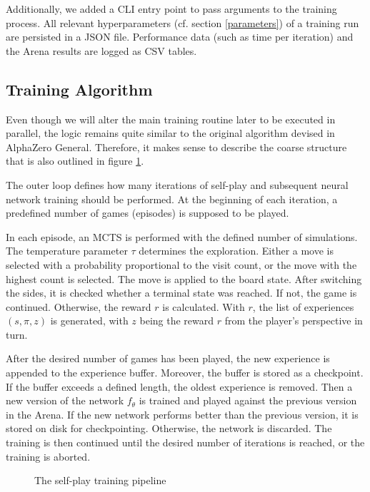 Additionally, we added a CLI entry point to pass arguments to the training process. All relevant hyperparameters (cf. section \ref{parameters}) of a training run are persisted in a JSON file. Performance data (such as time per iteration) and the Arena results are logged as CSV tables.

\subsection{Training Algorithm}
Even though we will alter the main training routine later to be executed in parallel, the logic remains quite similar to the original algorithm devised in AlphaZero General. Therefore, it makes sense to describe the coarse structure that is also outlined in figure \ref{training_algorithm}.

The outer loop defines how many iterations of self-play and subsequent neural network training should be performed. At the beginning of each iteration, a predefined number of games (episodes) is supposed to be played.

In each episode, an MCTS is performed with the defined number of simulations. The temperature parameter $\tau$ determines the exploration. Either a move is selected with a probability proportional to the visit count, or the move with the highest count is selected. The move is applied to the board state. After switching the sides, it is checked whether a terminal state was reached. If not, the game is continued. Otherwise, the reward $r$ is calculated. With $r$, the list of experiences $(s, \pi, z)$ is generated, with $z$ being the reward $r$ from the player's perspective in turn.

After the desired number of games has been played, the new experience is appended to the experience buffer. Moreover, the buffer is stored as a checkpoint. If the buffer exceeds a defined length, the oldest experience is removed. Then a new version of the network $f_{\theta}$ is trained and played against the previous version in the Arena. If the new network performs better than the previous version, it is stored on disk for checkpointing. Otherwise, the network is discarded. The training is then continued until the desired number of iterations is reached, or the training is aborted.

\begin{figure}[H]
    \centering
    \caption{The self-play training pipeline}
    \label{training_algorithm}
\end{figure}

